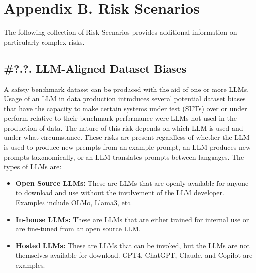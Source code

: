 \section{Appendix B. Risk Scenarios}

The following collection of Risk Scenarios provides additional information on particularly complex risks.

\subsection{\#?.?. LLM-Aligned Dataset Biases}

A safety benchmark dataset can be produced with the aid of one or more LLMs. Usage of an LLM in data production introduces several potential dataset biases that have the capacity to make certain systems under test (SUTs) over or under perform relative to their benchmark performance were LLMs not used in the production of data. The nature of this risk depends on which LLM is used and under what circumstance. These risks are present regardless of whether the LLM is used to produce new prompts from an example prompt, an LLM produces new prompts taxonomically, or an LLM translates prompts between languages. The types of LLMs are:


\begin{itemize}
\item \textbf{Open Source LLMs:} These are LLMs that are openly available for anyone to download and use without the involvement of the LLM developer. Examples include OLMo, Llama3, etc.
\item \textbf{In-house LLMs:} These are LLMs that are either trained for internal use or are fine-tuned from an open source LLM.
\item \textbf{Hosted LLMs:} These are LLMs that can be invoked, but the LLMs are not themselves available for download. GPT4, ChatGPT, Claude, and Copilot are examples.
\end{itemize}


